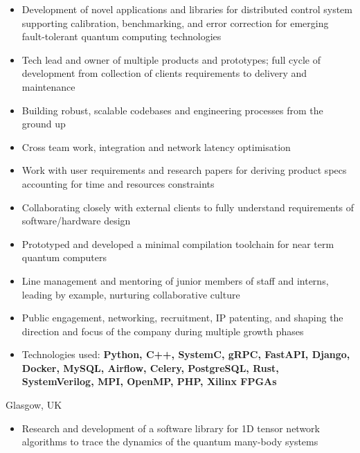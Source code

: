 \documentclass[10pt,a4paper,ragged2e,withhyper]{altacv}
\begin{document}
\begin{paracol}{2}
\begin{itemize}
    \item Development of novel applications and libraries for
    distributed control system supporting calibration, benchmarking,
    and error correction for emerging fault-tolerant quantum computing
    technologies

    \item Tech lead and owner of multiple products and prototypes;
    full cycle of development from collection of clients requirements to
    delivery and maintenance

    \item Building robust, scalable codebases and engineering processes
    from the ground up

    \item Cross team work, integration and network latency optimisation

    \item Work with user requirements and research papers for deriving product
    specs accounting for time and resources constraints
    
    \item Collaborating closely with external clients to fully understand
    requirements of software/hardware design

    \item Prototyped and developed a minimal compilation toolchain for near
    term quantum computers 
    
    \item Line management and mentoring of junior members of staff and interns,
    leading by example, nurturing collaborative culture

    \item Public engagement, networking, recruitment, IP patenting,
    and shaping the direction and focus of the company during multiple growth
    phases

    \item Technologies used:
    {\bf Python, C++, SystemC, gRPC, FastAPI, Django, Docker, MySQL, Airflow,
    Celery, PostgreSQL, Rust, SystemVerilog, MPI, OpenMP, PHP, Xilinx FPGAs}
\end{itemize}

\divider

{Glasgow, UK}

\begin{itemize}
    \item Research and development of a software library for 1D tensor network
    algorithms to trace the dynamics of the quantum many-body systems


\end{itemize}
\end{paracol}
\end{document}
